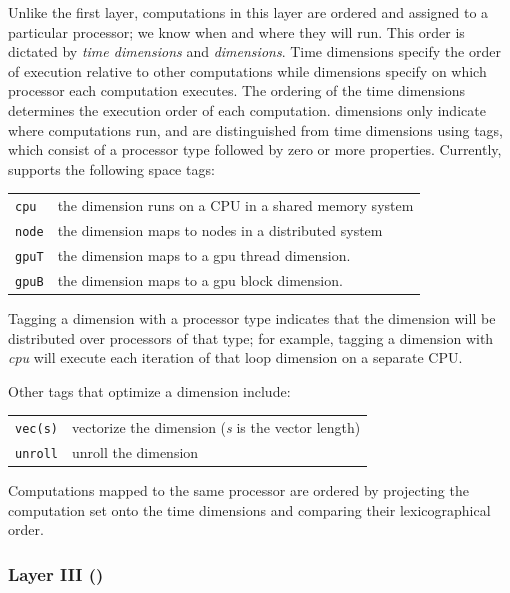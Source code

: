 Unlike the first layer, computations in this layer are ordered and assigned to a particular processor; we know when and where they will run.  This order is dictated by \textit{time dimensions} and \textit{\processor dimensions}.  Time dimensions specify the order of execution relative to other computations while \processor{} dimensions specify on which processor each computation executes.
The ordering of the time dimensions determines the execution order of each computation.
\Processor{} dimensions only indicate where computations run, and
are distinguished from time dimensions using tags, which consist of a processor type followed by
zero or more properties.  Currently, \framework{} supports the following space tags:

{
\centering
{
    \footnotesize
    \setlength\tabcolsep{5pt}
    \begin{tabular}{ll}
        \texttt{cpu} & the dimension runs on a CPU in a shared memory system \\
        \texttt{node} & the dimension maps to nodes in a distributed system \\
        \texttt{gpuT} & the dimension maps to a gpu thread dimension. \\
        \texttt{gpuB} & the dimension maps to a gpu block dimension.\\
    \end{tabular}
}
}

Tagging a dimension with a processor type indicates that the dimension will be distributed over processors of that type; for example, tagging a dimension with \emph{cpu} will execute each iteration of that loop dimension on a separate CPU.

Other tags that optimize a dimension include:

{
\centering
{
    \footnotesize
    \setlength\tabcolsep{5pt}
    \begin{tabular}{ll}
        \texttt{vec(s)} & vectorize the dimension (\emph{s} is the vector length)\\
        \texttt{unroll} & unroll the dimension\\
    \end{tabular}
}
}

Computations mapped to the same processor are ordered by projecting the computation set onto the time dimensions and comparing their lexicographical order.

\subsubsection{Layer III (\Layerthree)}
\label{layer3}

